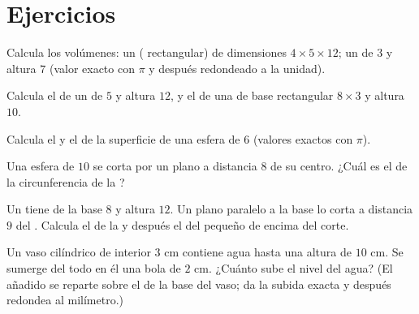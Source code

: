 \section{Ejercicios}

\begin{exercise}[$\star$]\label{exo:g9:solids:1}
Calcula los volúmenes: un  ( rectangular) de dimensiones $4 \times 5
\times 12$; un  de  $3$ y altura $7$ (valor exacto con
$\pi$ y después redondeado a la unidad).
\end{exercise}

\begin{exercise}[$\star$]\label{exo:g9:solids:2}
Calcula el  de un  de  $5$ y altura $12$, y el de una
 de base rectangular $8 \times 3$ y altura $10$.
\end{exercise}

\begin{exercise}[$\star$]\label{exo:g9:solids:3}
Calcula el  y el  de la superficie de una esfera de  $6$ (valores
exactos con $\pi$).
\end{exercise}

\begin{exercise}[$\star$]\label{exo:g9:solids:4}
Una esfera de  $10$ se corta por un plano a distancia $8$ de su
centro. ¿Cuál es el  de la circunferencia de la ?
\end{exercise}

\begin{exercise}[$\star\star$]\label{exo:g9:solids:5}
Un  tiene  de la base $8$ y altura $12$. Un plano paralelo a la base
lo corta a distancia $9$ del . Calcula el  de la
 y después el  del  pequeño de encima del corte.
\end{exercise}

\begin{exercise}[$\star\star$]\label{exo:g9:solids:6}
Un vaso cilíndrico de  interior $3$ cm contiene agua hasta una altura de
$10$ cm. Se sumerge del todo en él una bola de  $2$ cm. ¿Cuánto
sube el nivel del agua? (El  añadido se reparte sobre el  de la
base del vaso; da la subida exacta y después redondea al milímetro.)
\end{exercise}

